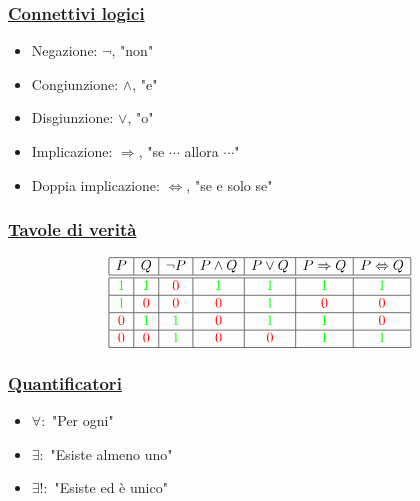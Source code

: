 \documentclass{article}
\newcommand{\ul}[1]{\underline{#1}}
\begin{document}
\subsubsection*{\color{blue}\ul{Connettivi logici}}
\begin{itemize}
	\item Negazione: $\neg$, "non"
	\item Congiunzione: $\wedge$, "e"
	\item Disgiunzione: $\vee$, "o"
	\item Implicazione: $\Rightarrow$, "se $\cdots$ allora $\cdots$"
	\item Doppia implicazione: $\Leftrightarrow$, "se e solo se"
\end{itemize}
\subsubsection*{\color{blue}\ul{Tavole di verità}}
\begin{displaymath}
	\begin{array}{|c|c|c|c|c|c|c|c|c|c|c|}
		\hline
		P              & Q              & \neg P         & P\wedge Q      & P\vee Q        & P\Rightarrow Q & P\Leftrightarrow Q \\
		\hline\hline
		\color{green}1 & \color{green}1 & \color{red}0   & \color{green}1 & \color{green}1 & \color{green}1 & \color{green}1     \\
		\hline
		\color{green}1 & \color{red}0   & \color{red}0   & \color{red}0   & \color{green}1 & \color{red}0   & \color{red}0       \\
		\hline
		\color{red}0   & \color{green}1 & \color{green}1 & \color{red}0   & \color{green}1 & \color{green}1 & \color{red}0       \\
		\hline
		\color{red}0   & \color{red}0   & \color{green}1 & \color{red}0   & \color{red}0   & \color{green}1 & \color{green}1     \\
		\hline
	\end{array}
\end{displaymath}
\subsubsection*{\color{blue}\ul{Quantificatori}}
\begin{itemize}
	\item $\forall:$ "Per ogni"
	\item $\exists:$ "Esiste almeno uno"
	\item $\exists!:$ "Esiste ed è unico"
\end{itemize}
\end{document}
